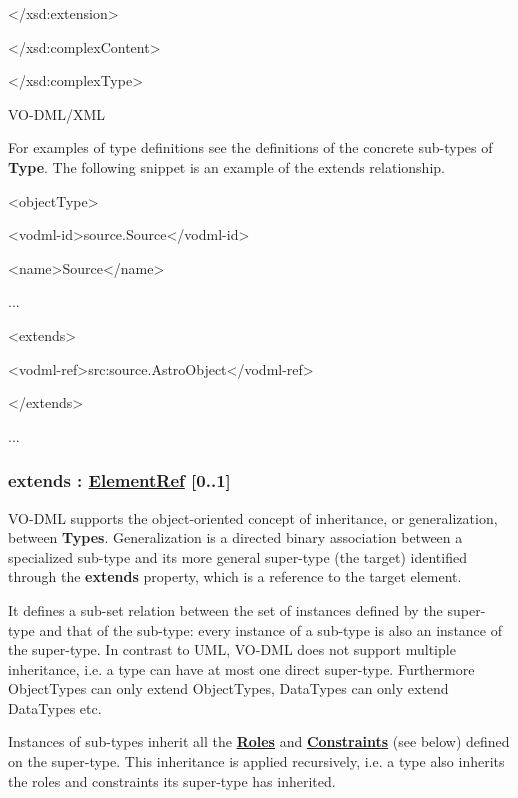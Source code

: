 \documentclass[10pt,a4paper]{ivoa}
\begin{document}
\textless/xsd:extension\textgreater{}

\textless/xsd:complexContent\textgreater{}

\textless/xsd:complexType\textgreater{}

VO-DML/XML

For examples of type definitions see the definitions of the concrete
sub-types of \textbf{Type}. The following snippet is an example of the
extends relationship.

\textless objectType\textgreater{}

\textless vodml-id\textgreater source.Source\textless/vodml-id\textgreater{}

\textless name\textgreater Source\textless/name\textgreater{}

...

\textless extends\textgreater{}

\textless vodml-ref\textgreater src:source.AstroObject\textless/vodml-ref\textgreater{}

\textless/extends\textgreater{}

...

\hypertarget{extends-elementref-0..1}{%
\subsubsection{\texorpdfstring{extends :
\protect\hyperlink{elementref}{ElementRef}
{[}0..1{]}}{extends : ElementRef {[}0..1{]}}}\label{extends-elementref-0..1}}

VO-DML supports the object-oriented concept of inheritance, or
generalization, between \textbf{Types}. Generalization is a directed
binary association between a specialized sub-type and its more general
super-type (the target) identified through the \textbf{extends}
property, which is a reference to the target element.

It defines a sub-set relation between the set of instances defined by
the super-type and that of the sub-type: every instance of a sub-type is
also an instance of the super-type. In contrast to UML, VO-DML does not
support multiple inheritance, i.e. a type can have at most one direct
super-type. Furthermore ObjectTypes can only extend ObjectTypes,
DataTypes can only extend DataTypes etc.

Instances of sub-types inherit all the
\protect\hyperlink{role-extends-referableelement}{\textbf{Roles}} and
\protect\hyperlink{constraint}{\textbf{Constraints}} (see below) defined
on the super-type. This inheritance is applied recursively, i.e. a type
also inherits the roles and constraints its super-type has inherited.
\end{document}
